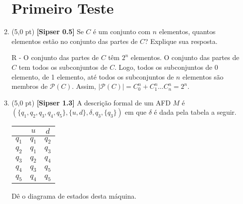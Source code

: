\documentclass[12pt,a4paper,oneside]{article}
\begin{document}
\begin{enumerate}
	
	\section*{Primeiro Teste}
	
	\item (5,0 pt) {\bf [Sipser 0.5]} Se $C$ é um conjunto com $n$ elementos, quantos elementos estão no conjunto das partes de $C$? Explique sua resposta.
	
	\vspace*{0.1cm}
	
	{\color{blue} R - O conjunto das partes de $C$ têm $2^n$ elementos. O conjunto das partes de $C$ tem todos os subconjuntos de $C$. Logo, todos os subconjuntos de 0 elemento, de 1 elemento, até todos os subconjuntos de $n$ elementos são membros de $\mathcal{P}(C)$. Assim, $|\mathcal{P}(C)| = C^n_0 + C^n_1 \ldots C^n_n = 2^n$.
	}
	
	\item (5,0 pt) {\bf [Sipser 1.3]} A descrição formal de um AFD $M$ é \\
	$(\{q_1, q_2, q_3, q_4, q_5\}, \{u,d\}, \delta, q_3, \{q_3\})$ em que $\delta$ é dada pela tabela a seguir.
	
	\begin{center}
		\begin{tabular}{c|cc}
					&	$u$		&	$d$	\\
			\hline
			$q_1$	&	$q_1$ 	&	$q_2$	\\
			$q_2$	&	$q_1$ 	&	$q_3$	\\
			$q_3$	&	$q_2$ 	&	$q_4$	\\
			$q_4$	&	$q_3$ 	&	$q_5$	\\
			$q_5$	&	$q_4$ 	&	$q_5$	\\
			\hline
		\end{tabular}
	\end{center}
	
	Dê o diagrama de estados desta máquina.
	
	\vspace*{0.3cm}
	
	{\color{blue}
		
	}


\end{enumerate}
\end{document}
